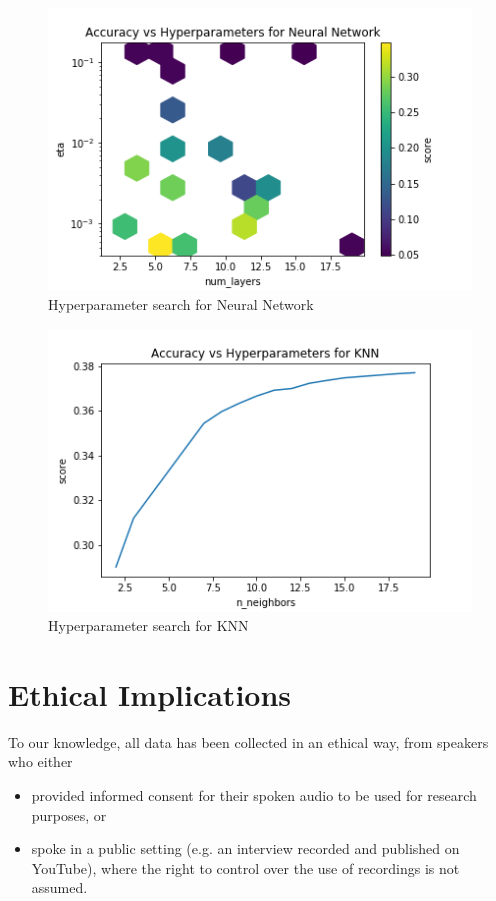 \documentclass{article}
\begin{document}
\begin{figure}
    \centering
    \includegraphics[width=\linewidth]{visualizations/nn.png}
    \caption{Hyperparameter search for Neural Network}
    \label{fig:classical-results}
\end{figure}

\begin{figure}
    \centering
    \includegraphics[width=\linewidth]{visualizations/knn.png}
    \caption{Hyperparameter search for KNN}
    \label{fig:classical-results}
\end{figure}

\section{Ethical Implications}

To our knowledge, all data has been collected in an ethical way, from speakers who either
\begin{itemize}
    \item provided informed consent for their spoken audio to be used for research purposes, or
    \item spoke in a public setting (e.g. an interview recorded and published on YouTube), where the right to control over the use of recordings is not assumed.
\end{itemize}
\end{document}
